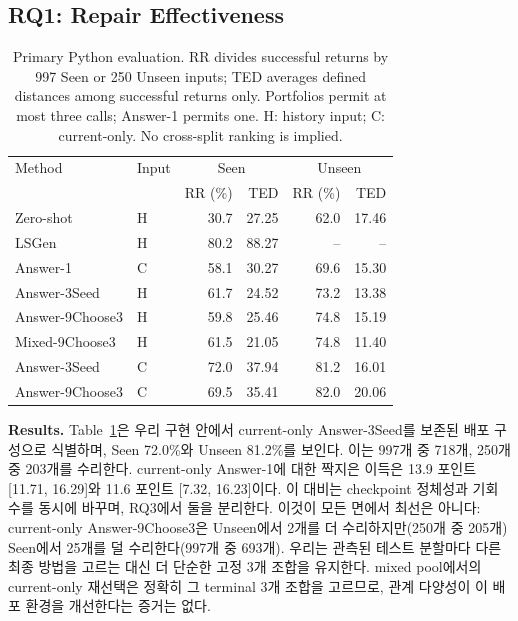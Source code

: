 \documentclass[10pt,conference]{IEEEtran}
\begin{document}
\subsection{RQ1: Repair Effectiveness}
\begin{table}[h]
\caption{Primary Python evaluation. RR divides successful returns by 997 Seen or 250 Unseen inputs; TED averages defined distances among successful returns only. Portfolios permit at most three calls; Answer-1 permits one. H: history input; C: current-only. No cross-split ranking is implied.}
\label{tab:main}
\centering\small
\begin{tabular}{@{}ll||rr|rr@{}}
\toprule
Method & Input & \multicolumn{2}{c|}{Seen} & \multicolumn{2}{c}{Unseen} \\
 & & RR (\%) & TED & RR (\%) & TED \\
\midrule
Zero-shot & H & 30.7 & 27.25 & 62.0 & 17.46 \\
LSGen & H & 80.2 & 88.27 & -- & -- \\
Answer-1 & C & 58.1 & 30.27 & 69.6 & 15.30 \\
Answer-3Seed & H & 61.7 & 24.52 & 73.2 & 13.38 \\
Answer-9Choose3 & H & 59.8 & 25.46 & 74.8 & 15.19 \\
Mixed-9Choose3 & H & 61.5 & 21.05 & 74.8 & 11.40 \\
\midrule
Answer-3Seed & C & 72.0 & 37.94 & 81.2 & 16.01 \\
Answer-9Choose3 & C & 69.5 & 35.41 & 82.0 & 20.06 \\
\bottomrule
\end{tabular}
\end{table}

\noindent\textbf{Results.} Table~\ref{tab:main}은 우리 구현 안에서 current-only Answer-3Seed를 보존된 배포 구성으로 식별하며, Seen 72.0\%와 Unseen 81.2\%를 보인다. 이는 997개 중 718개, 250개 중 203개를 수리한다. current-only Answer-1에 대한 짝지은 이득은 13.9 포인트 [11.71, 16.29]와 11.6 포인트 [7.32, 16.23]이다. 이 대비는 checkpoint 정체성과 기회 수를 동시에 바꾸며, RQ3에서 둘을 분리한다. 이것이 모든 면에서 최선은 아니다: current-only Answer-9Choose3은 Unseen에서 2개를 더 수리하지만(250개 중 205개) Seen에서 25개를 덜 수리한다(997개 중 693개). 우리는 관측된 테스트 분할마다 다른 최종 방법을 고르는 대신 더 단순한 고정 3개 조합을 유지한다. mixed pool에서의 current-only 재선택은 정확히 그 terminal 3개 조합을 고르므로, 관계 다양성이 이 배포 환경을 개선한다는 증거는 없다.
\end{document}

